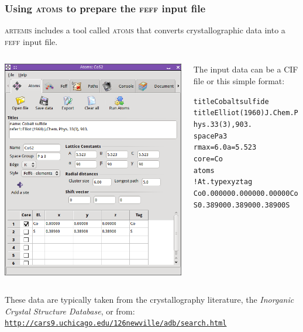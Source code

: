 \documentclass[10pt, xcolor=x11names, compress]{beamer}
\begin{document}
\begin{frame}[fragile]
  \frametitle{Using \textsc{atoms} to prepare the \textsc{feff} input file}
  \textsc{artemis} includes a tool called \textsc{atoms} that converts
  crystallographic data into a \textsc{feff} input file.

  \medskip

  \begin{columns}[c]
    \begin{column}[c]{0.5\linewidth}
      \begin{center}
        \includegraphics[width=0.7\linewidth]{images/artemis_atoms}
      \end{center}
    \end{column}
    \begin{column}[c]{0.5\linewidth}
      The input data can be a CIF file or this simple format:
      \begin{block}{}
        \begin{alltt}
          \tiny
 {\color{Green4}title Cobalt sulfide}
 {\color{Green4}title Elliot (1960) J.Chem. Phys. 33(3), 903.}
 {\color{Brown4}space} P a 3
 {\color{Brown4}rmax}=6.0   {\color{Brown4}a}=5.523
 {\color{Brown4}core}=Co
 {\color{Brown4}atoms}
 {\color{Blue4}! At.type   x     y     z      tag}
    Co     0.00000   0.00000   0.00000  Co
    S      0.38900   0.38900   0.38900  S
         \end{alltt}
       \end{block}
     \end{column}
   \end{columns}

   \bigskip

   These data are typically taken from the crystallography literature,
   the \textit{Inorganic Crystal Structure Database}, or from:
   \href{http://cars9.uchicago.edu/\char126newville/adb/search.html}
   {\color{Blue4}\texttt{http://cars9.uchicago.edu/\char126newville/adb/search.html}}
\end{frame}
\end{document}
